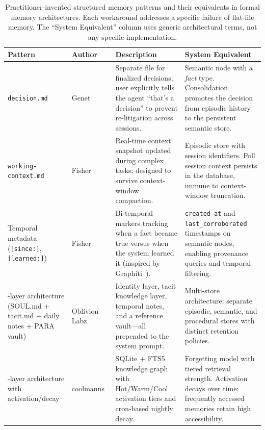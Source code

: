 \begin{table}[!t]
\centering
\caption{Practitioner-invented structured memory patterns and their
equivalents in formal memory architectures.  Each workaround addresses a
specific failure of flat-file memory.  The ``System Equivalent'' column
uses generic architectural terms, not any specific implementation.}
\label{tab:structure-workarounds}
\footnotesize
\begin{tabular}{@{}L{3.2cm}L{2.3cm}L{3.9cm}L{4.0cm}@{}}
\toprule
\textbf{Pattern} & \textbf{Author} & \textbf{Description} & \textbf{System Equivalent} \\
\midrule
\texttt{decision.md}
  & Genet~\cite{genet2026}
  & Separate file for finalized decisions; user explicitly tells the
    agent ``that's a decision'' to prevent re-litigation across sessions.
  & Semantic node with a \emph{fact} type.  Consolidation promotes the
    decision from episodic history to the persistent semantic store. \\
\addlinespace
\texttt{working-context.md}
  & Fisher~\cite{fisher2026}
  & Real-time context snapshot updated during complex tasks; designed to
    survive context-window compaction.
  & Episodic store with session identifiers.  Full session context
    persists in the database, immune to context-window truncation. \\
\addlinespace
Temporal metadata (\texttt{[since:]}, \texttt{[learned:]})
  & Fisher~\cite{fisher2026}
  & Bi-temporal markers tracking when a fact became true versus when the
    system learned it (inspired by Graphiti~\cite{dempsey2025graphiti}).
  & \texttt{created\_at} and \texttt{last\_corroborated} timestamps on
    semantic nodes, enabling provenance queries and temporal filtering. \\
-layer architecture (SOUL.md + tacit.md + daily notes + PARA vault)
  & Oblivion Labz~\cite{oblivionlabz2025}
  & Identity layer, tacit knowledge layer, temporal notes, and a
    reference vault---all prepended to the system prompt.
  & Multi-store architecture: separate episodic, semantic, and
    procedural stores with distinct retention policies. \\
-layer architecture with activation/decay
  & coolmanns~\cite{coolmanns2026}
  & SQLite + FTS5 knowledge graph with Hot/Warm/Cool activation tiers
    and cron-based nightly decay.
  & Forgetting model with tiered retrieval strength.  Activation decays
    over time; frequently accessed memories retain high accessibility. \\

\end{tabular}
\end{table}
